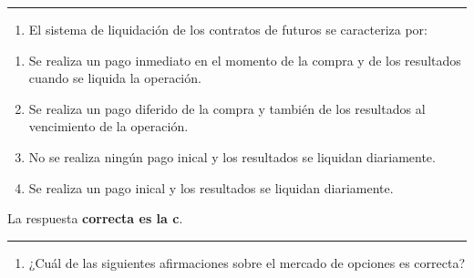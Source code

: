\documentclass[
  letterpaper,
  DIV=11,
  numbers=noendperiod]{scrreprt}
\providecommand{\tightlist}{%
  \setlength{\itemsep}{0pt}\setlength{\parskip}{0pt}}\usepackage{longtable,booktabs,array}
\begin{document}
\begin{center}\rule{0.5\linewidth}{0.5pt}\end{center}

\begin{enumerate}
\def\labelenumi{\arabic{enumi}.}
\setcounter{enumi}{64}
\tightlist
\item
  El sistema de liquidación de los contratos de futuros se caracteriza
  por:
\end{enumerate}

\begin{enumerate}
\def\labelenumi{\alph{enumi}.}
\item
  Se realiza un pago inmediato en el momento de la compra y de los
  resultados cuando se liquida la operación.
\item
  Se realiza un pago diferido de la compra y también de los resultados
  al vencimiento de la operación.
\item
  No se realiza ningún pago inical y los resultados se liquidan
  diariamente.
\item
  Se realiza un pago inical y los resultados se liquidan diariamente.
\end{enumerate}

\begin{tcolorbox}[enhanced jigsaw, left=2mm, opacityback=0, colback=white, breakable, arc=.35mm, bottomrule=.15mm, rightrule=.15mm, toprule=.15mm, leftrule=.75mm, colframe=quarto-callout-tip-color-frame]
\begin{minipage}[t]{5.5mm}
\textcolor{quarto-callout-tip-color}{\faLightbulb}
\end{minipage}%
\begin{minipage}[t]{\textwidth - 5.5mm}

La respuesta \textbf{correcta es la c}.

\end{minipage}%
\end{tcolorbox}

\begin{center}\rule{0.5\linewidth}{0.5pt}\end{center}

\begin{enumerate}
\def\labelenumi{\arabic{enumi}.}
\setcounter{enumi}{65}
\tightlist
\item
  ¿Cuál de las siguientes afirmaciones sobre el mercado de opciones es
  correcta?
\end{enumerate}
\end{document}
